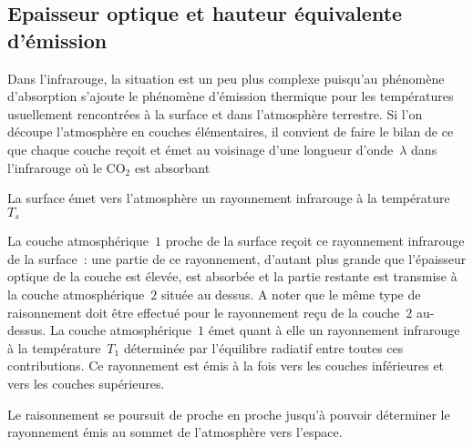 \sk
\subsection{Epaisseur optique et hauteur équivalente d'émission}



\sk
Dans l'infrarouge, la situation est un peu plus complexe puisqu'au phénomène d'absorption s'ajoute le phénomène d'émission thermique pour les températures usuellement rencontrées à la surface et dans l'atmosphère terrestre. Si l'on découpe l'atmosphère en couches élémentaires, il convient de faire le bilan de ce que chaque couche reçoit et émet au voisinage d'une longueur d'onde~$\lambda$ dans l'infrarouge où le CO$_2$ est absorbant
\begin{citemize}
\item La surface émet vers l'atmosphère un rayonnement infrarouge à la température~$T_s$
\item La couche atmosphérique~$1$ proche de la surface reçoit ce rayonnement infrarouge de la surface~: une partie de ce rayonnement, d'autant plus grande que l'épaisseur optique de la couche est élevée, est absorbée et la partie restante est transmise à la couche atmosphérique~$2$ située au dessus. A noter que le même type de raisonnement doit être effectué pour le rayonnement reçu de la couche~$2$ au-dessus. La couche atmosphérique~$1$ émet quant à elle un rayonnement infrarouge à la température~$T_1$ déterminée par l'équilibre radiatif entre toutes ces contributions. Ce rayonnement est émis à la fois vers les couches inférieures et vers les couches supérieures.
\item Le raisonnement se poursuit de proche en proche jusqu'à pouvoir déterminer le rayonnement émis au sommet de l'atmosphère vers l'espace.
\end{citemize}

